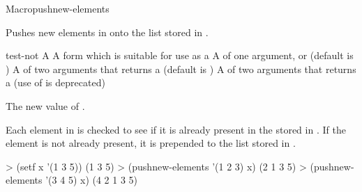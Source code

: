 \documentclass[10pt,twoside,english,pdftex]{article}
\begin{document}
\begin{functiondoc}{Macro}{pushnew-elements}{ 
     \returns{} } 
%
%
  
\fnsyntax

\fnpurpose Pushes new elements in  onto the list stored in
. 

\fnpackage {}

\fnmodule {}

\fnargs
\begin{args}{test-not}
\arg[list] A 
\arg[place] A form which is suitable for use as a
\arg[key] A  of one argument, or \nil{} (default is \nil)
\arg[test] A  of two arguments that returns a
 (default is ) 
 A  of two arguments that returns a
 (use of  is deprecated)
\end{args}

\fnreturns The new value of . 

\fndescription Each element in  is checked to see if it is
already present in the  stored in . If
the element is not already present, it is prepended to the list stored
in .

\fnexamples
\begin{example}
> (setf x '(1 3 5))
(1 3 5)
> (pushnew-elements '(1 2 3) x)
(2 1 3 5)
> (pushnew-elements '(3 4 5) x)
(4 2 1 3 5)
\end{example}

\end{functiondoc}

\end{document}
